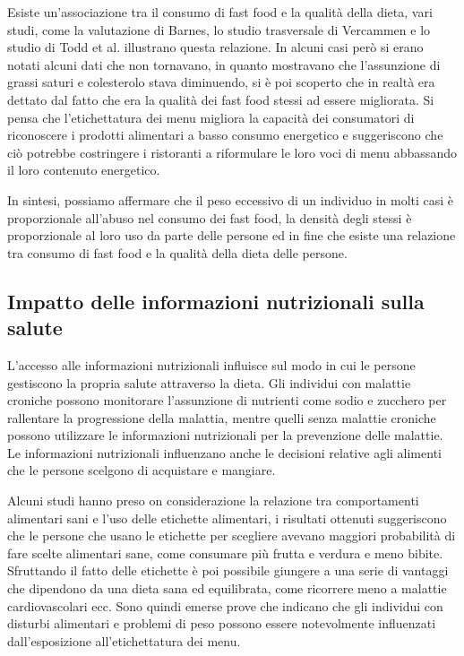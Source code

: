 Esiste un'associazione tra il consumo di fast food e la qualità della dieta, vari studi, come la valutazione di Barnes, lo studio trasversale di Vercammen e lo studio di Todd et al. illustrano questa relazione.
In alcuni casi però si erano notati alcuni dati che non tornavano, in quanto mostravano che l'assunzione di grassi saturi e colesterolo stava diminuendo, si è poi scoperto che in realtà era dettato dal fatto che era la qualità dei fast food stessi ad essere migliorata.
Si pensa che l'etichettatura dei menu migliora la capacità dei consumatori di riconoscere i prodotti alimentari a basso consumo energetico e suggeriscono che ciò potrebbe costringere i ristoranti a riformulare le loro voci di menu abbassando il loro contenuto energetico.

In sintesi, possiamo affermare che il peso eccessivo di un individuo in molti casi è proporzionale all'abuso nel consumo dei fast food, la densità degli stessi è proporzionale al loro uso da parte delle persone ed in fine che esiste una relazione tra consumo di fast food e la qualità della dieta delle persone.

\subsection{Impatto delle informazioni nutrizionali sulla salute}
L'accesso alle informazioni nutrizionali influisce sul modo in cui le persone gestiscono la propria salute attraverso la dieta. Gli individui con malattie croniche possono monitorare l'assunzione di nutrienti come sodio e zucchero per rallentare la progressione della malattia, mentre quelli senza malattie croniche possono utilizzare le informazioni nutrizionali per la prevenzione delle malattie. Le informazioni nutrizionali influenzano anche le decisioni relative agli alimenti che le persone scelgono di acquistare e mangiare.

Alcuni studi hanno preso on considerazione la relazione tra comportamenti alimentari sani e l'uso delle etichette alimentari, i risultati ottenuti suggeriscono che le persone che usano le etichette per scegliere avevano maggiori probabilità di fare scelte alimentari sane, come consumare più frutta e verdura e meno bibite. Sfruttando il fatto delle etichette è poi possibile giungere a una serie di vantaggi che dipendono da una dieta sana ed equilibrata, come ricorrere meno a malattie cardiovascolari ecc.
Sono quindi emerse prove che indicano che gli individui con disturbi alimentari e problemi di peso possono essere notevolmente influenzati dall'esposizione all'etichettatura dei menu.
